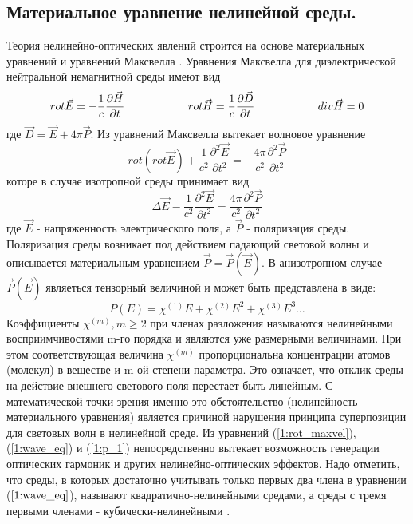 \subsection{Материальное уравнение нелинейной среды.} 
\hspace*{2mm}
Теория нелинейно-оптических явлений строится на основе материальных уравнений и уравнений Максвелла  \cite{achmanov2}. Уравнения Максвелла для диэлектрической нейтральной немагнитной среды имеют вид
\begin{equation}\label{1:maxvel}
rot\vec{E} = - \frac{ 1 }{ c}\frac{\partial \vec{H} }{\partial t}
\hspace{20mm}
rot\vec{H} =  \frac{ 1 }{ c}\frac{\partial \vec{D} }{\partial t}
\hspace{20mm}
div\vec{H} = 0
\end{equation}где $ \vec{D} = \vec{E} + 4\pi \vec{P}$. Из уравнений Максвелла вытекает волновое уравнение
\begin{equation}\label{1:rot_maxvel}
rot(rot\vec{E}) + \frac{ 1 }{ c^2 }\frac{\partial^2 \vec{E} }{\partial t^2} = - \frac{ 4\pi }{ c^2 }\frac{\partial^2 \vec{P} }{\partial t^2}
\end{equation}которе в случае изотропной среды принимает вид
\begin{equation}\label{1:wave_eq}
\Delta\vec{E} - \frac{ 1 }{ c^2 }\frac{\partial^2 \vec{E} }{\partial t^2} =  \frac{ 4\pi }{ c^2 }\frac{\partial^2 \vec{P} }{\partial t^2}
\end{equation}где $\vec{E}$ - напряженность электрического поля, а $\vec{P}$ - поляризация среды. Поляризация среды возникает под действием падающий световой волны и описывается материальным уравнением $\vec{P} = \vec{P}(\vec{E})$.
В анизотропном случае $\vec{P}(\vec{E})$ являеться тензорный величиной и может быть представлена в виде:
\begin{equation}\label{1:p_1}
P(E) = \chi^{(1)}E + \chi^{(2)}E^2 +\chi^{(3)}E^3\dots
\end{equation}Коэффициенты $\chi^{(m)}, m \ge 2$ при членах разложения называются нелинейными восприимчивостями m-го порядка и являются уже размерными величинами. При этом соответствующая величина $\chi^{(m)}$ пропорциональна концентрации атомов (молекул) в веществе и m-ой степени параметра. Это означает, что отклик среды на действие внешнего светового поля перестает быть линейным.  С математической точки зрения именно это обстоятельство (нелинейность материального уравнения) является причиной нарушения принципа суперпозиции для световых волн в нелинейной среде. Из уравнений (\ref{1:rot_maxvel}), (\ref{1:wave_eq}) и (\ref{1:p_1}) непосредственно вытекает возможность генерации оптических гармоник и других нелинейно-оптических эффектов.  Надо отметить, что среды, в которых достаточно учитывать только первых два члена в уравнении ($\ref{1:wave_eq}$), называют квадратично-нелинейными средами, а среды с тремя первыми членами - кубически-нелинейными \cite{achmanov2}. 

